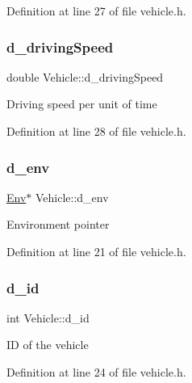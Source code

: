 Definition at line 27 of file vehicle.\+h.

\mbox{\label{class_vehicle_ace0ade1b8f4eed589c9e6c3649fb4ec3}} 
\subsubsection{\texorpdfstring{d\+\_\+driving\+Speed}{d\_drivingSpeed}}
{\footnotesize\ttfamily double Vehicle\+::d\+\_\+driving\+Speed\hspace{0.3cm}{\ttfamily [private]}}

Driving speed per unit of time 

Definition at line 28 of file vehicle.\+h.

\mbox{\label{class_vehicle_ac747e63cc697d1f8690d5ab4204840c4}} 
\subsubsection{\texorpdfstring{d\+\_\+env}{d\_env}}
{\footnotesize\ttfamily \hyperlink{class_env}{Env}$\ast$ Vehicle\+::d\+\_\+env\hspace{0.3cm}{\ttfamily [private]}}

Environment pointer 

Definition at line 21 of file vehicle.\+h.

\mbox{\label{class_vehicle_ac43dc59528652696b3db319ef52f8185}} 
\subsubsection{\texorpdfstring{d\+\_\+id}{d\_id}}
{\footnotesize\ttfamily int Vehicle\+::d\+\_\+id\hspace{0.3cm}{\ttfamily [private]}}

ID of the vehicle 

Definition at line 24 of file vehicle.\+h.

\mbox{\label{class_vehicle_a058ff58ef59467d28d21a529731af3e0}} 
